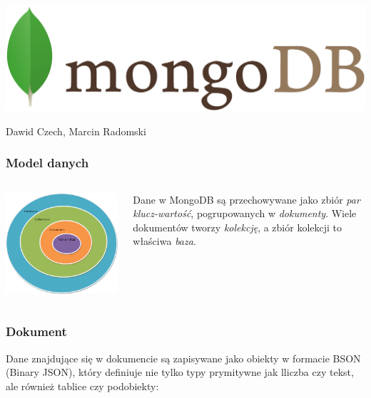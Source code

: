 \documentclass{beamer}
\begin{document}
  \begin{frame}
    \begin{center}
      \includegraphics[width=\textwidth,keepaspectratio]{img/logo.png}

      Dawid Czech, Marcin Radomski
    \end{center}
  \end{frame}

  \begin{frame}
    \frametitle{Model danych}
    \begin{columns}
      \includegraphics[scale=0.5]{img/db-structure.png}

      Dane w MongoDB są przechowywane jako zbiór \emph{par klucz-wartość}, pogrupowanych w \emph{dokumenty}. Wiele dokumentów tworzy \emph{kolekcję}, a zbiór kolekcji to właściwa \emph{baza}.
    \end{columns}
  \end{frame}

  \begin{frame}
    \frametitle{Dokument}
    Dane znajdujące się w dokumencie są zapisywane jako obiekty w formacie BSON (Binary JSON), który definiuje nie tylko typy prymitywne jak lliczba czy tekst, ale również tablice czy podobiekty:
    
  \end{frame}
\end{document}
